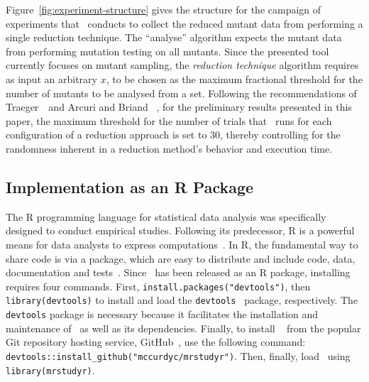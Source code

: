 Figure~\ref{fig:experiment-structure} gives the structure for the campaign of experiments that \mr~conducts to collect
the reduced mutant data from performing a single reduction technique. The ``analyse'' algorithm expects the mutant data
from performing mutation testing on all mutants. Since the presented tool currently focuses on mutant sampling, the
\textit{reduction technique} algorithm requires as input an arbitrary $x$, to be chosen as the maximum fractional threshold
for the number of mutants to be analysed from a set. Following the recommendations of Traeger~\etal~and Arcuri and Briand
~\cite{traeger2008nine, arcuri2014hitchhiker}, for the preliminary results presented in this paper, the maximum threshold
for the number of trials that \mr~runs for each configuration of a reduction approach is set to 30, thereby controlling for
the randomness inherent in a reduction method's behavior and execution time.

\subsection{Implementation as an R Package}

The R programming language for statistical data analysis was specifically designed to conduct empirical studies. Following
its predecessor, R is a powerful means for data analysts to express computations~\cite{ihaka1996r}.  In R, the fundamental
way to share code is via a package, which are  easy to distribute and include code, data, documentation and tests~\cite{wickham2015r}.
Since \mr~has been released as an R package, installing requires four commands.  First, \texttt{install.packages("devtools")},
then {\small\texttt{library(devtools)}} to install and load the {\small\texttt{devtools}}~\cite{devtools} package, respectively.
The \texttt{devtools} package is necessary because it facilitates the installation and maintenance of \mr~as well as its dependencies.
Finally, to install \mr~\cite{tool} from the popular Git repository hosting service, GitHub~\cite{github}, use the following command:
{\small\texttt{devtools::install\_github("mccurdyc/mrstudyr")}}.  Then, finally, load \mr~using \texttt{library(mrstudyr)}.


